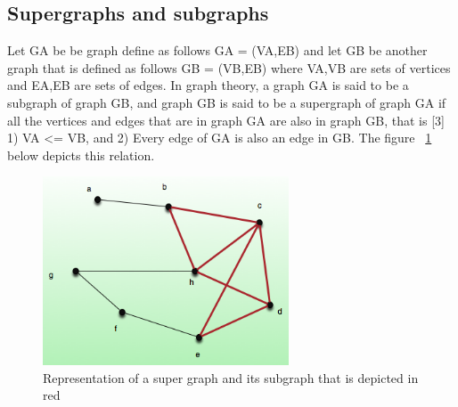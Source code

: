 \subsection{Supergraphs and subgraphs}
Let G{\tiny A} be be graph define as follows G{\tiny A} = (VA,EB) and let G{\tiny B} be another graph that is defined as follows G{\tiny B} = (VB,EB) where VA,VB are sets of vertices and EA,EB are sets of edges.
In graph theory, a graph G{\tiny A} is said to be a subgraph of graph G{\tiny B}, and graph G{\tiny B} is said to be a supergraph of graph G{\tiny A} if all the vertices and edges that are in graph G{\tiny A} are also in graph
G{\tiny B}, that is [3]
1) VA <= VB, and
2) Every edge of G{\tiny A} is also an edge in G{\tiny B}. \newline\newline
The figure  ~\ref{fig:supersubgraph}  below depicts this relation.
\begin{figure}[H]
  \begin{center}
      \includegraphics[width=0.65\textwidth]{supersubgraph.png}
  \end{center}     
  \caption{Representation of a super graph and its subgraph that is depicted in red}
  \label{fig:supersubgraph}
\end{figure}

